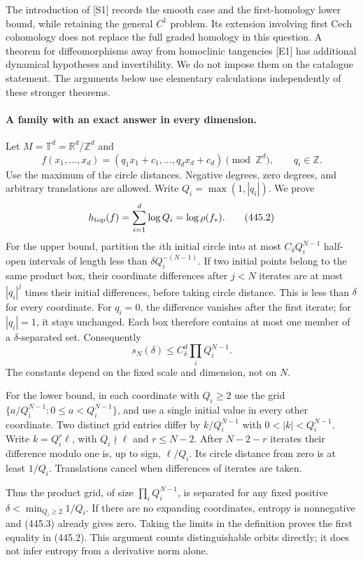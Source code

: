 \documentclass[11pt]{article}
\begin{document}
The introduction of [S1] records the smooth case and the first-homology lower bound, while retaining the general $C^1$ problem. Its extension involving first Cech cohomology does not replace the full graded homology in this question. A theorem for diffeomorphisms away from homoclinic tangencies [E1] has additional dynamical hypotheses and invertibility. We do not impose them on the catalogue statement. The arguments below use elementary calculations independently of these stronger theorems.

\paragraph{A family with an exact answer in every dimension.}
Let $M=\mathbb T^d=\mathbb R^d/\mathbb Z^d$ and
\[
 f(x_1,\ldots,x_d)=(q_1x_1+c_1,\ldots,q_dx_d+c_d)
       \pmod {\mathbb Z^d},\qquad q_i\in\mathbb Z.
 \tag{445.1}
\]
Use the maximum of the circle distances. Negative degrees, zero degrees, and arbitrary translations are allowed. Write $Q_i=\max(1,|q_i|)$. We prove
\[
 h_{\rm top}(f)=\sum_{i=1}^d\log Q_i
              =\log\rho(f_*).
 \tag{445.2}
\]
For the upper bound, partition the $i$th initial circle into at most $C_\delta Q_i^{N-1}$ half-open intervals of length less than $\delta Q_i^{-(N-1)}$. If two initial points belong to the same product box, their coordinate differences after $j<N$ iterates are at most $|q_i|^j$ times their initial differences, before taking circle distance. This is less than $\delta$ for every coordinate. For $q_i=0$, the difference vanishes after the first iterate; for $|q_i|=1$, it stays unchanged. Each box therefore contains at most one member of a $\delta$-separated set. Consequently
\[
 s_N(\delta)\le C_\delta^d\prod_i Q_i^{N-1}.
 \tag{445.3}
\]
The constants depend on the fixed scale and dimension, not on $N$.

For the lower bound, in each coordinate with $Q_i\ge2$ use the grid $\{a/Q_i^{N-1}:0\le a<Q_i^{N-1}\}$, and use a single initial value in every other coordinate. Two distinct grid entries differ by $k/Q_i^{N-1}$ with $0<|k|<Q_i^{N-1}$. Write $k=Q_i^r\ell$, with $Q_i\nmid\ell$ and $r\le N-2$. After $N-2-r$ iterates their difference modulo one is, up to sign, $\ell/Q_i$. Its circle distance from zero is at least $1/Q_i$. Translations cancel when differences of iterates are taken.

Thus the product grid, of size $\prod_i Q_i^{N-1}$, is separated for any fixed positive $\delta<\min_{Q_i\ge2}1/Q_i$. If there are no expanding coordinates, entropy is nonnegative and (445.3) already gives zero. Taking the limits in the definition proves the first equality in (445.2). This argument counts distinguishable orbits directly; it does not infer entropy from a derivative norm alone.
\end{document}
